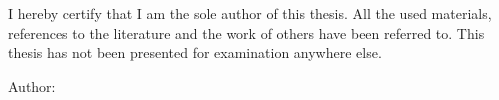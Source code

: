 I hereby certify that I am the sole author of this thesis. All the used materials, references
to the literature and the work of others have been referred to. This thesis has not been
presented for examination anywhere else.


\begin{flushleft}

Author:~\authorName\\
\vspace*{0.5cm}
\signatureDate
 
\end{flushleft}
